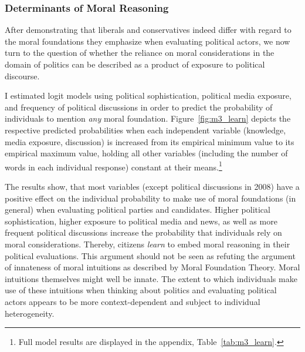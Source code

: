 \documentclass[12pt]{article}
\begin{document}
\subsubsection{Determinants of Moral Reasoning}

After demonstrating that liberals and conservatives indeed differ with regard to the moral foundations they emphasize when evaluating political actors, we now turn to the question of whether the reliance on moral considerations in the domain of politics can be described as a product of exposure to political discourse.

I estimated logit models using political sophistication, political media exposure, and frequency of political discussions in order to predict the probability of individuals to mention \textit{any} moral foundation. Figure~\ref{fig:m3_learn} depicts the respective predicted probabilities when each independent variable (knowledge, media exposure, discussion) is increased from its empirical minimum value to its empirical maximum value, holding all other variables (including the number of words in each individual response) constant at their means.\footnote{Full model results are displayed in the appendix, Table~\ref{tab:m3_learn}.}

The results show, that most variables (except political discussions in 2008) have a positive effect on the individual probability to make use of moral foundations (in general) when evaluating political parties and candidates. Higher political sophistication, higher exposure to political media and news, as well as more frequent political discussions increase the probability that individuals rely on moral considerations. Thereby, citizens \textit{learn} to embed moral reasoning in their political evaluations. This argument should not be seen as refuting the argument of innateness of moral intuitions as described by Moral Foundation Theory. Moral intuitions themselves might well be innate. The extent to which individuals make use of these intuitions when thinking about politics and evaluating political actors appears to be more context-dependent and subject to individual heterogeneity.
\end{document}
